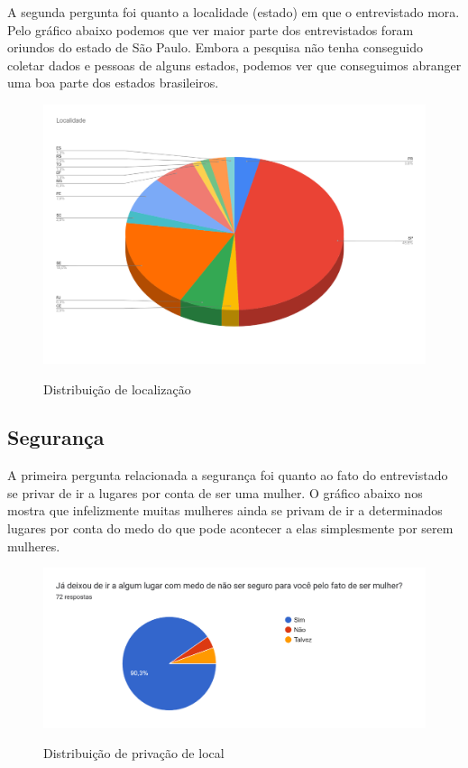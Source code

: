A segunda pergunta foi quanto a localidade (estado) em que o entrevistado mora. Pelo gráfico abaixo podemos que ver maior parte dos entrevistados foram oriundos do estado de São Paulo. Embora a pesquisa não tenha conseguido coletar dados e pessoas de alguns estados, podemos ver que conseguimos abranger uma boa parte dos estados brasileiros.

\begin{figure}[htbp]
  \begin{center}
  \includegraphics[width=1.0\linewidth]{images/distribuicao-estados.png}\\
  \end{center}
  \caption[Distribuição de localização]{Distribuição de localização}
  \label{fig:mapa-empatia=inicial}
\end{figure}

\subsection{Segurança}
A primeira pergunta relacionada a segurança foi quanto ao fato do entrevistado se privar de ir a lugares por conta de ser uma mulher. O gráfico abaixo nos mostra que infelizmente muitas mulheres ainda se privam de ir a determinados lugares por conta do medo do que pode acontecer a elas simplesmente por serem mulheres. 
\begin{figure}[h]
  \begin{center}
  \includegraphics[width=1.0\linewidth]{images/distribuicao-privacao-mulher.png}\\
  \end{center}
  \caption[Distribuição de privação de local]{Distribuição de privação de local}
  \label{fig:mapa-empatia=inicial}
\end{figure}
\clearpage

